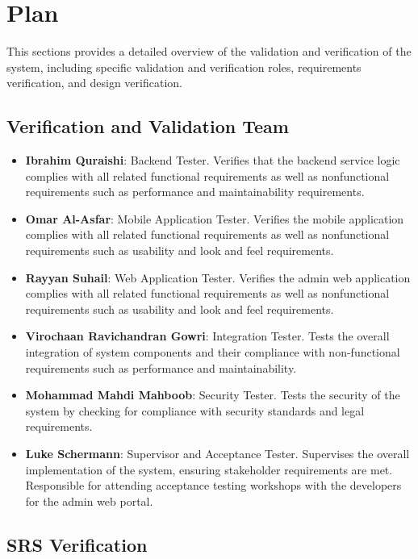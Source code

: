 \documentclass[12pt, titlepage]{article}
\begin{document}
\section{Plan}

This sections provides a detailed overview of the validation and verification of the system, including specific validation and verification roles, requirements verification, and design verification.

\subsection{Verification and Validation Team}

\begin{itemize}
  \item \textbf{Ibrahim Quraishi}: Backend Tester. Verifies that the backend service logic complies with all related functional requirements as well as nonfunctional requirements such as performance and maintainability requirements.
  \item \textbf{Omar Al-Asfar}: Mobile Application Tester. Verifies the mobile application complies with all related functional requirements as well as nonfunctional requirements such as usability and look and feel requirements.
  \item \textbf{Rayyan Suhail}: Web Application Tester. Verifies the admin web application complies with all related functional requirements as well as nonfunctional requirements such as usability and look and feel requirements.
  \item \textbf{Virochaan Ravichandran Gowri}: Integration Tester. Tests the overall integration of system components and their compliance with non-functional requirements such as performance and maintainability.
  \item \textbf{Mohammad Mahdi Mahboob}: Security Tester. Tests the security of the system by checking for compliance with security standards and legal requirements.
  \item \textbf{Luke Schermann}: Supervisor and Acceptance Tester. Supervises the overall implementation of the system, ensuring stakeholder requirements are met. Responsible for attending acceptance testing workshops with the developers for the admin web portal.
\end{itemize}

\subsection{SRS Verification}
\end{document}
